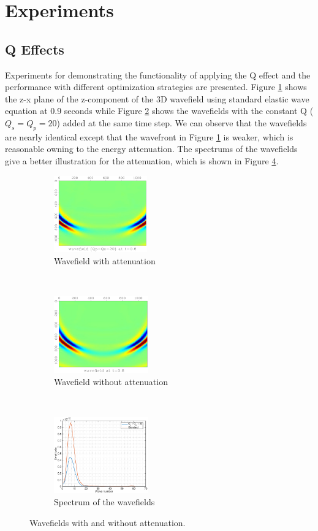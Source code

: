 \documentclass{paris17}
\begin{document}
\section{Experiments}

\subsection{Q Effects}
Experiments for demonstrating the functionality of applying the Q effect and the performance with different optimization strategies are presented. Figure \ref{fig:with-attenuation} shows the z-x plane of the z-component of the 3D wavefield using standard elastic wave equation at 0.9 seconds while Figure \ref{fig:without-attenuation} shows the wavefields with the constant Q ($Q_s=Q_p=20$) added at the same time step. We can observe that the wavefields are nearly identical except that the wavefront in Figure \ref{fig:with-attenuation} is weaker, which is reasonable owning to the energy attenuation. The spectrums of the wavefields give a better illustration for the attenuation, which is shown in Figure \ref{fig:spectrum}.

\begin{figure}[h]
    \centering
    \begin{subfigure}[b]{0.3\textwidth}
        \centering
        \includegraphics[height=1.3in]{./fig/q20.pdf}
        \caption{Wavefield with attenuation}
        \label{fig:with-attenuation}
    \end{subfigure}
    ~
    \begin{subfigure}[b]{0.3\textwidth}
        \centering
        \includegraphics[height=1.3in]{./fig/std.pdf}
        \caption{Wavefield without attenuation}
        \label{fig:without-attenuation}
    \end{subfigure}%
    ~
    \begin{subfigure}[b]{0.3\textwidth}
        \centering
        \includegraphics[height=1.3in]{./fig/spec.eps}
        \caption{Spectrum of the wavefields}
        \label{fig:spectrum}
    \end{subfigure}
    \caption{Wavefields with and without attenuation.}
\end{figure}
\end{document}
